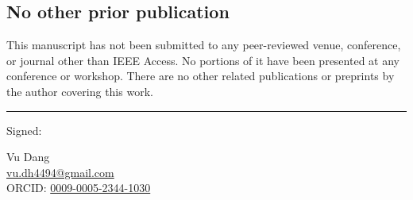 \documentclass[11pt]{article}
\begin{document}
\vspace{1em}

\subsection*{No other prior publication}

This manuscript has not been submitted to any peer-reviewed venue,
conference, or journal other than IEEE Access. No portions of it have
been presented at any conference or workshop. There are no other
related publications or preprints by the author covering this work.

\vspace{2em}\hrule\vspace{1em}

\noindent Signed:

\medskip

\noindent Vu Dang \\
\href{mailto:vu.dh4494@gmail.com}{vu.dh4494@gmail.com} \\
ORCID: \href{https://orcid.org/0009-0005-2344-1030}{0009-0005-2344-1030}
\end{document}
